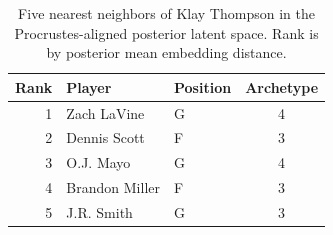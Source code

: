 \begin{table}[htbp]
  \centering\small
  \begin{tabular}{rllc}
    \toprule
    Rank & Player & Position & Archetype \\
    \midrule
    1 & Zach LaVine & G & 4 \\
    2 & Dennis Scott & F & 3 \\
    3 & O.J. Mayo & G & 4 \\
    4 & Brandon Miller & F & 3 \\
    5 & J.R. Smith & G & 3 \\
    \bottomrule
  \end{tabular}
  \caption{Five nearest neighbors of Klay Thompson in the Procrustes-aligned posterior latent space. Rank is by posterior mean embedding distance.}
  \label{tab:Klay_Thompson_neighbors}
\end{table}

